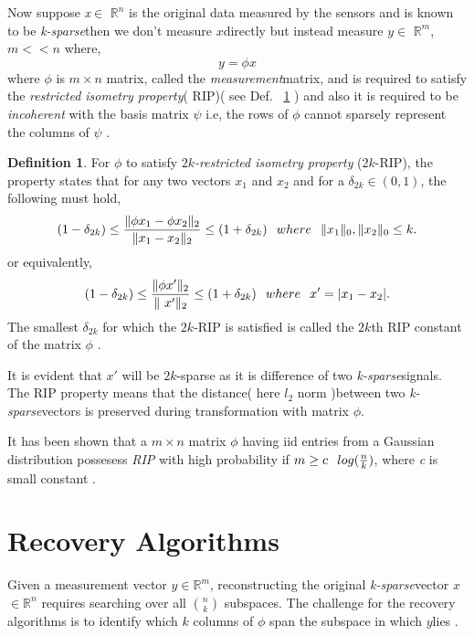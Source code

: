 \documentclass[12pt]{article}
\theoremstyle{definition}
\newtheorem{defn}{Definition}[section]
\def\ksparse{\textit{k-sparse}\hspace{0.1in}}
\def\measurement{\textit{measurement}\hspace{0.1in}}
\def\x{$x$\hspace{0.1in}}
\def\y{$y$\hspace{0.1in}}
\begin{document}
\par Now suppose \textit{x}$\in$ $\mathbb{R}^n$ is the original data measured by the sensors and 
is known to be \ksparse then we don't measure \x directly but instead measure \y$\in$ $\mathbb{R}^m$, $m << n$ where,
\begin{equation}
 y = \phi x
\end{equation}
where $\phi$ is $m\times n$ matrix, called the \measurement matrix, and is required to satisfy the \textit{restricted
isometry property}( RIP)( see Def. ~\ref{def:RIP} ) and also it is required to be \textit{incoherent} with the basis matrix $\psi$ 
i.e, the rows of $\phi$ cannot sparsely represent the columns of $\psi$ \cite{Baraniuk-CS}.
\begin{defn}
 For $\phi$ to satisfy $2k$\textit{-restricted isometry property} ($2k$-RIP), the property states that 
 for any two vectors $x_1$ and $x_2$ and for
 a $\delta_{2k} \in (0,1)$, the following must hold,
  \begin{equation}
  (1 - \delta_{2k}) \leq \frac{\|\phi x_1-\phi x_2 \|_2}{\|x_1-x_2\|_2} \leq (1 + \delta_{2k}) \hspace{0.1in}
  where \hspace{0.1in} \|x_1\|_0, \|x_2\|_0 \leq k.
 \end{equation}
 or equivalently,
 \begin{equation}
  (1 - \delta_{2k}) \leq \frac{\|\phi x'\|_2}{\|\ x'\|_2} \leq (1 + \delta_{2k}) \hspace{0.1in}
  where \hspace{0.1in} x'=|x_1-x_2|.
 \end{equation}
 The smallest $\delta_{2k}$ for which the $2k$-RIP is satisfied is called the 
 $2k$th RIP constant of the matrix $\phi$ \cite{Needell-CoSaMP}.
 \label{def:RIP}
  \end{defn}
  It is evident that $x'$ will be $2k$-sparse as it is difference of two \ksparse signals.
  The RIP property means that the distance( here $l_2$ norm )between two \ksparse vectors is preserved
  during transformation with matrix $\phi$.
  
 \par It has been shown that a $m \times n$ matrix $\phi$ having iid entries from a Gaussian distribution
  possesess \textit{RIP} with high probability if $m \geq c\hspace{0.1in}log(\frac{n}{k})$, 
 where \textit{c} is small constant \cite{Baraniuk-CS}.

\section{Recovery Algorithms}
Given a measurement vector \y $\in \mathbb{R}^m$, reconstructing the original \ksparse vector \x $\in \mathbb{R}^n$
requires searching over all $\binom{n}{k}$ subspaces. The challenge for the recovery algorithms is to identify 
which $k$ columns of $\phi$ span the subspace in which \y lies \cite{Dai-subspace}.
\end{document}
